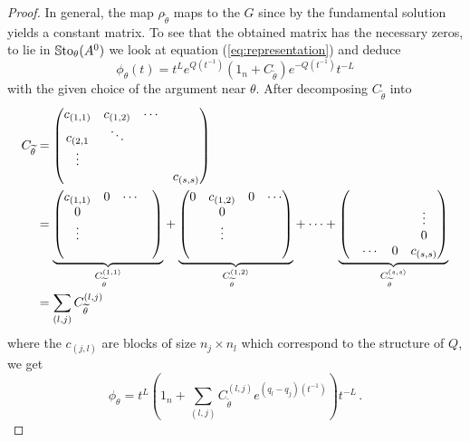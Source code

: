 \begin{proof}
  In general, the map $\rho_{\tilde\theta}$ maps to the $G$ since \TODO{} by
  the fundamental solution yields a constant matrix. To see that the obtained
  matrix has the necessary zeros, to lie in $\operatorname{\mathbb{S}to}_{\theta}(A^0)$ we look at
  equation (\ref{eq:representation}) and deduce
  \[
    \phi_\theta(t)
    =t^L e^{Q(t^{-1})}(1_n+C_{\tilde\theta})e^{-Q(t^{-1})}t^{-L}
  \]
  with the given choice of the argument near $\theta$.
  After decomposing $C_{\tilde\theta}$ into
  \begin{align*}
    C_{\tilde\theta}&=\begin{pmatrix}
      c_{(1,1)} & c_{(1,2)} & \cdots &\\
      c_{(2,1} & \ddots\\
      \vdots \\
      & & & c_{(s,s)}
    \end{pmatrix}
  \\&=
    \underset{C_{\tilde\theta}^{(1,1)}}{\underbrace{%
      \begin{pmatrix}
        c_{(1,1)} & 0 & \cdots &\\
        0\\
        \vdots&\\
        &
      \end{pmatrix}
    }}
    +
    \underset{C_{\tilde\theta}^{(1,2)}}{\underbrace{%
      \begin{pmatrix}
        0 & c_{(1,2)} & 0 & \cdots\\
        & 0 &\\
        &\vdots\\
        &
      \end{pmatrix}
    }}
    +\cdots+
    \underset{C_{\tilde\theta}^{(s,s)}}{\underbrace{%
      \begin{pmatrix}
        &\\
        & & & \vdots\\
        & & & 0\\
        & \cdots & 0 & c_{(s,s)}
      \end{pmatrix}
    }}
  \\&=\sum_{(l,j)}C_{\tilde\theta}^{(l,j)}
  \end{align*}
  where the $c_{(j,l)}$ are blocks of size $n_j\times n_l$ which correspond to
  the structure of $Q$, we get
  \[
    \phi_\theta=
      t^L\left(
        1_n+\sum_{(l,j)}C_{\tilde\theta}^{(l,j)}e^{(q_l-q_j)(t^{-1})}
      \right)t^{-L} \,.
  \]
  \begin{comment}

\end{comment}
\end{proof}
